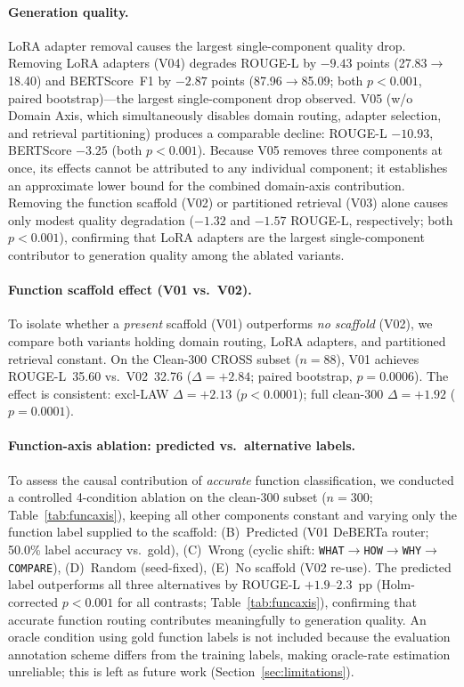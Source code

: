 \documentclass[a4paper,fleql]{cas-sc}
\begin{document}
\paragraph{Generation quality.}
LoRA adapter removal causes the largest single-component quality drop.
Removing LoRA adapters (V04) degrades ROUGE-L by $-9.43$ points
(27.83$\to$18.40) and BERTScore~F1 by $-2.87$ points (87.96$\to$85.09;
both $p{<}0.001$, paired bootstrap)---the largest single-component drop observed.
V05 (w/o Domain Axis, which simultaneously disables domain routing, adapter
selection, and retrieval partitioning) produces a comparable decline:
ROUGE-L $-10.93$, BERTScore $-3.25$ (both $p{<}0.001$).
Because V05 removes three components at once, its effects cannot be attributed to
any individual component; it establishes an approximate lower bound for the combined
domain-axis contribution.
Removing the function scaffold (V02) or partitioned retrieval (V03) alone causes
only modest quality degradation ($-1.32$ and $-1.57$ ROUGE-L, respectively;
both $p{<}0.001$), confirming that LoRA adapters are the largest single-component
contributor to generation quality among the ablated variants.

\paragraph{Function scaffold effect (V01 vs.\ V02).}
To isolate whether a \emph{present} scaffold (V01) outperforms \emph{no scaffold}
(V02), we compare both variants holding domain routing, LoRA adapters, and
partitioned retrieval constant.
On the Clean-300 CROSS subset ($n{=}88$), V01 achieves ROUGE-L~35.60 vs.\
V02~32.76 ($\Delta{=}{+2.84}$; paired bootstrap, $p{=}0.0006$).
The effect is consistent: excl-LAW $\Delta{=}{+2.13}$ ($p{<}0.0001$);
full clean-300 $\Delta{=}{+1.92}$ ($p{=}0.0001$).

\paragraph{Function-axis ablation: predicted vs.\ alternative labels.}
To assess the causal contribution of \emph{accurate} function classification,
we conducted a controlled 4-condition ablation on the clean-300 subset ($n{=}300$;
Table~\ref{tab:funcaxis}), keeping all other components constant and varying only the function label supplied to the scaffold:
(B)~Predicted (V01 DeBERTa router; 50.0\% label accuracy vs.\ gold),
(C)~Wrong (cyclic shift: \texttt{WHAT}$\to$\texttt{HOW}$\to$\texttt{WHY}$\to$\texttt{COMPARE}),
(D)~Random (seed-fixed),
(E)~No scaffold (V02 re-use).
The predicted label outperforms all three alternatives by ROUGE-L $+1.9$--$2.3$~pp
(Holm-corrected $p{<}0.001$ for all contrasts; Table~\ref{tab:funcaxis}),
confirming that accurate function routing contributes meaningfully to generation quality.
An oracle condition using gold function labels is not included because the evaluation
annotation scheme differs from the training labels, making oracle-rate estimation
unreliable; this is left as future work (Section~\ref{sec:limitations}).
\end{document}
